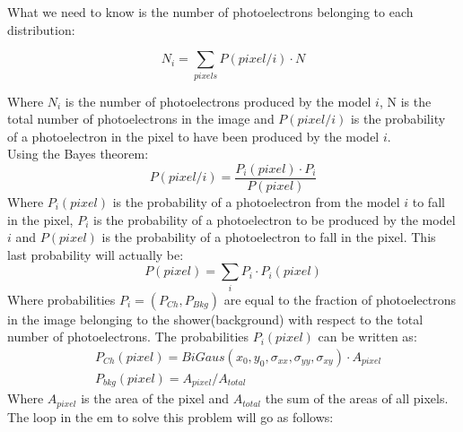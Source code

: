 \documentclass[main.tex]{subfiles}
\begin{document}
What we need to know is the number of photoelectrons belonging to each distribution:

\begin{equation}
  N_{i} = \sum_{pixels} P(pixel/i)\cdot N
\end{equation}

Where $N_i$ is the number of photoelectrons produced by the model $i$, N is the total number of photoelectrons in the image and $P(pixel/i)$ is the probability of a photoelectron in the pixel to have been produced by the model $i$.\\
Using the Bayes theorem:
\begin{equation}\label{eq:bayes}
  P(pixel/i) = \frac{P_i(pixel) \cdot P_i}{P(pixel)}
\end{equation}
Where $P_i(pixel)$ is the probability of a photoelectron from the model $i$ to fall in the pixel, $P_i$ is the probability of a photoelectron to be produced by the model $i$ and $P(pixel)$ is the probability of a photoelectron to fall in the pixel. This last probability will actually be:
\begin{equation}
P(pixel) = \sum_{i} P_i \cdot P_i(pixel)
\end{equation}
Where probabilities $P_i=(P_{Ch}, P_{Bkg})$ are equal to the fraction of photoelectrons in the image belonging to the shower(background) with respect to the total number of photoelectrons. The probabilities $P_i(pixel)$ can be written as:
\begin{equation}
  \begin{split}
  & P_{Ch}(pixel) = BiGaus(x_{0}, y_{0},\sigma_{xx}, \sigma_{yy}, \sigma_{xy}) \cdot A_{pixel}\\
  & P_{bkg}(pixel) = A_{pixel}/A_{total}
  \end{split}
\end{equation}
Where $A_{pixel}$ is the area of the pixel and $A_{total}$ the sum of the areas of all pixels.\\
The loop in the \gls{em} to solve this problem will go as follows:
\end{document}
